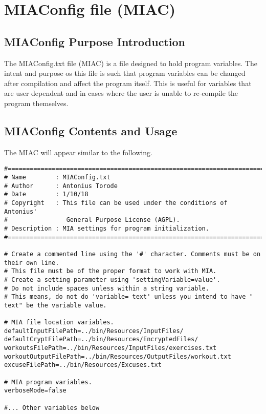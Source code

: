 \chapter{MIAConfig file (MIAC)} \label{MIAC}
\pagestyle{fancy}

\lstset{language=Python}

\section{MIAConfig Purpose Introduction}

The MIAConfig.txt file (MIAC) is a file designed to hold program variables. The intent and purpose os this file is such that program variables can be changed after compilation and affect the program itself. This is useful for variables that are user dependent and in cases where the user is unable to re-compile the program themselves. 

\section{MIAConfig Contents and Usage}

The MIAC will appear similar to the following.

\begin{lstlisting}
#============================================================================
# Name        : MIAConfig.txt
# Author      : Antonius Torode
# Date        : 1/10/18
# Copyright   : This file can be used under the conditions of Antonius' 
#				 General Purpose License (AGPL).
# Description : MIA settings for program initialization.
#============================================================================

# Create a commented line using the '#' character. Comments must be on their own line.
# This file must be of the proper format to work with MIA.
# Create a setting parameter using 'settingVariable=value'.
# Do not include spaces unless within a string variable. 
# This means, do not do 'variable= text' unless you intend to have " text" be the variable value.

# MIA file location variables.
defaultInputFilePath=../bin/Resources/InputFiles/
defaultCryptFilePath=../bin/Resources/EncryptedFiles/
workoutsFilePath=../bin/Resources/InputFiles/exercises.txt
workoutOutputFilePath=../bin/Resources/OutputFiles/workout.txt
excuseFilePath=../bin/Resources/Excuses.txt

# MIA program variables.
verboseMode=false

#... Other variables below
\end{lstlisting}

